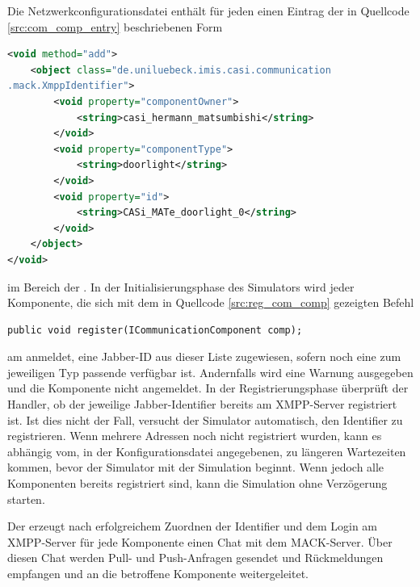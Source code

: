 Die Netzwerkconfigurationsdatei enthält für jeden  einen Eintrag der in Quellcode \ref{src:com_comp_entry} beschriebenen Form
\begin{illfloat}[p]
\begin{lstlisting}[language=XML]
<void method="add">
	<object class="de.uniluebeck.imis.casi.communication
.mack.XmppIdentifier">
		<void property="componentOwner">
			<string>casi_hermann_matsumbishi</string>
		</void>
		<void property="componentType">
			<string>doorlight</string>
		</void>
		<void property="id">
			<string>CASi_MATe_doorlight_0</string>
		</void>
	</object>
</void>
\end{lstlisting}
\label{src:com_comp_entry}
\end{illfloat}
im Bereich der  . In der Initialisierungsphase des Simulators wird jeder Komponente, die sich mit dem in Quellcode \ref{src:reg_com_comp} gezeigten Befehl 
\begin{illfloat}[p]
   \begin{lstlisting}
public void register(ICommunicationComponent comp);
   \end{lstlisting}
\label{src:reg_com_comp}
\end{illfloat}
am  anmeldet, eine Jabber-ID aus dieser Liste zugewiesen, sofern noch eine zum jeweiligen Typ passende verfügbar ist. Andernfalls wird eine Warnung ausgegeben und die Komponente nicht angemeldet.
In der Registrierungsphase überprüft der Handler, ob der jeweilige Jabber-Identifier bereits am XMPP-Server registriert ist. Ist dies nicht der Fall, versucht der Simulator automatisch, den Identifier zu registrieren. Wenn mehrere Adressen noch nicht registriert wurden, kann es abhängig vom, in der Konfigurationsdatei angegebenen,  zu längeren Wartezeiten kommen, bevor der Simulator mit der Simulation beginnt. Wenn jedoch alle Komponenten bereits registriert sind, kann die Simulation ohne Verzögerung starten.

Der  erzeugt nach erfolgreichem Zuordnen der Identifier und dem Login am XMPP-Server für jede Komponente einen Chat mit dem MACK-Server. Über diesen Chat werden Pull- und Push-Anfragen gesendet und Rückmeldungen empfangen und an die betroffene Komponente weitergeleitet.

